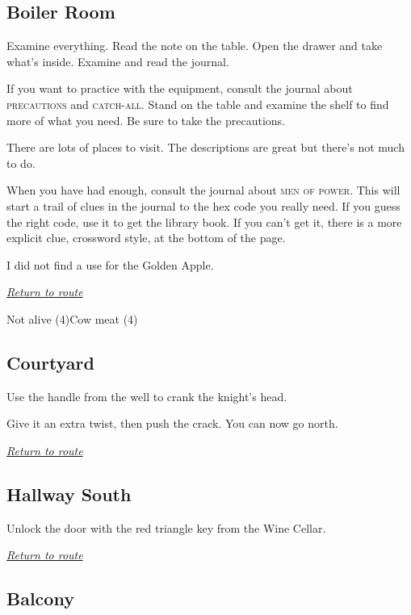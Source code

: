 \documentclass[a5paper]{extarticle}
\begin{document}
\newpage
\subsection{Boiler Room}\label{sec:sol-Boiler-Room}

Examine everything. Read the note on the table.
Open the drawer and take what's inside.
Examine and read the journal.

If you want to practice with the equipment, consult the journal about
\textsc{precautions} and \textsc{catch-all}.
Stand on the table and examine the shelf to find more of what you need.
Be sure to take the precautions.

There are lots of places to visit.
The descriptions are great but there's not much to do.

When you have had enough, consult the journal about \textsc{men of power}.
This will start a trail of clues in the journal to the hex code you really need.
If you guess the right code, use it to get the library book.
If you can't get it, there is a more explicit clue, crossword style,
at the bottom of the page.

I did not find a use for the Golden Apple.

\hyperref[sec:route-8]{\emph{Return to route}}

\vfill
Not alive (4)\quad Cow meat (4)

\newpage
\subsection{Courtyard}\label{sec:sol-Courtyard}

Use the handle from the well to crank the knight's head.

Give it an extra twist, then push the crack.
You can now go north.

\hyperref[sec:route-8]{\emph{Return to route}}

\newpage
\subsection{Hallway South}\label{sec:sol-Hallway-South-1}

Unlock the door with the red triangle key from the Wine Cellar.

\hyperref[sec:route-9]{\emph{Return to route}}

\newpage
\subsection{Balcony}\label{sec:sol-Balcony}
\end{document}
